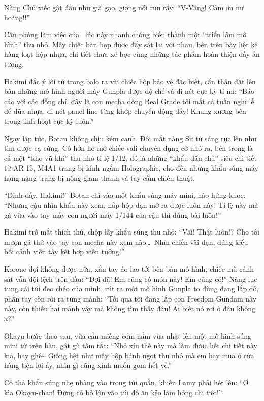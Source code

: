 \documentclass[../main.tex]{subfiles}
\begin{document}
Nàng Chủ xiếc gật đầu như giã gạo, giọng nói run rẩy: ``V-Vâng! Cảm ơn nữ hoàng!!''

\ct

Căn phòng làm việc của \hll\ lúc này nhanh chóng biến thành một ``triển lãm mô hình'' thu nhỏ. Mấy chiếc bàn họp được đẩy sát lại với nhau, bên trên bày liệt kê hàng loạt hộp nhựa, chi tiết chưa xé bọc cùng những tác phẩm hoàn thiện đầy ấn tượng.

Hakimi đắc ý lôi từ trong balo ra vài chiếc hộp bảo vệ đặc biệt, cẩn thận đặt lên bàn những mô hình người máy Gunpla được độ chế và đi nét cực kỳ tỉ mỉ: ``Báo cáo với các đồng chí, đây là con mecha dòng Real Grade tôi mất cả tuần nghỉ lễ để dũa nhựa, đi nét panel line từng khớp chuyển động đấy! Khung xương bên trong linh hoạt cực kỳ luôn.''

Ngay lập tức, Botan không chịu kém cạnh. Đôi mắt nàng Sư tử sáng rực lên như tìm được cạ cứng. Cô hớn hở mở chiếc vali chuyên dụng cỡ nhỏ ra, bên trong là cả một ``kho vũ khí'' thu nhỏ tỉ lệ 1/12, đó là những ``khẩu dân chủ'' siêu chi tiết từ AR-15, M4A1 trang bị kính ngắm Holographic, cho đến những khẩu súng máy hạng nặng trang bị nòng giảm thanh và tay cầm chiến thuật.

``Đỉnh đấy, Hakimi!'' Botan chỉ vào một khẩu súng máy mini, hào hứng khoe: ``Nhưng cậu nhìn khẩu này xem, nắp hộp đạn mở ra được luôn này! Tỉ lệ này mà gá vừa vào tay mấy con người máy 1/144 của cậu thì đúng bài luôn!''

Hakimi trố mắt thích thú, chộp lấy khẩu súng thu nhỏ: ``Vãi! Thật luôn!? Cho tôi mượn gá thử vào tay con mecha này xem nào\dots\ Nhìn chiến vãi đạn, đúng kiểu bối cảnh viễn tây kết hợp viễn tưởng!''

Korone đợi không được nữa, xắn tay áo lao tới bên bàn mô hình, chiếc mũ cảnh sát vẫn đội lệch trên đầu: ``Đợi đã! Em cũng có món này! Em cũng có!'' Nàng lục tung cái túi đeo chéo của mình, rút ra một mô hình Gunpla to đùng đang lắp dở, phần tay còn rời ra từng mảnh: ``Tối qua tôi đang lắp con Freedom Gundam này này, còn thiếu hai mảnh vây mà không tìm thấy đâu! Ai biết nó rơi ở đâu không ạ?''

Okayu bước theo sau, vừa cắn miếng cơm nắm vừa nhặt lên một mô hình súng mini từ trên bàn, gật gù tấm tắc: ``Nhỏ xíu thế này mà làm được hết chi tiết này kia, hay ghê\~{} Giống hệt như mấy hộp bánh ngọt thu nhỏ mà em hay mua ở cửa hàng tiện lợi ấy, nhìn gì cũng xinh muốn gom hết về.''

Cô thả khẩu súng nhẹ nhàng vào trong túi quần, khiến Lamy phải hét lên: ``Ơ kìa Okayu-chan! Đừng có bỏ lộn vào túi đồ ăn kẻo làm hỏng chi tiết!''
\end{document}
